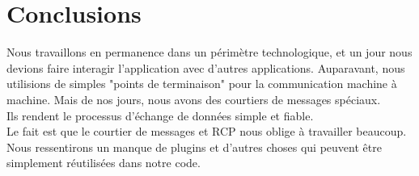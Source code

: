 \section*{Conclusions}


Nous travaillons en permanence dans un périmètre technologique, et un jour nous devions faire interagir l'application avec d'autres applications.
Auparavant, nous utilisions de simples "points de terminaison" pour la communication machine à machine. Mais de nos jours, nous avons des courtiers de messages spéciaux.\\
Ils rendent le processus d'échange de données simple et fiable.\\
Le fait est que le courtier de messages et RCP nous oblige à travailler beaucoup. Nous ressentirons un manque de plugins et d'autres choses qui peuvent être simplement réutilisées dans notre code.\\
\clearpage